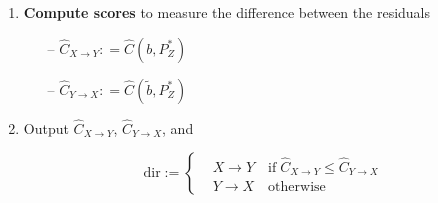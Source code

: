 \begin{algorithm}[H]
\begin{enumerate}
        \item \textbf{Compute scores} to measure the difference between the residuals
        \begin{itemize}
            \item[--] $\hat{C}_{X \rightarrow Y}: = \hat{C}( b, P^*_Z  )$ 
            \item[--] $\hat{C}_{Y \rightarrow X}: = \hat{C}( \tilde{b}, P^*_Z  )$
        \end{itemize}        

        \item Output $\hat{C}_{X \rightarrow Y}$, $\hat{C}_{Y \rightarrow X}$, and
        
        \[ 
        \text{dir} :=  
         \begin{cases} 
            & X \rightarrow Y \quad \text{if} \; \hat{C}_{X \rightarrow Y} \leq \hat{C}_{Y \rightarrow X}\\
            & Y \rightarrow X \quad \text{otherwise}
         \end{cases}
        \]
        
    \end{enumerate}

  \label{alg:residual}
  \end{algorithm}
